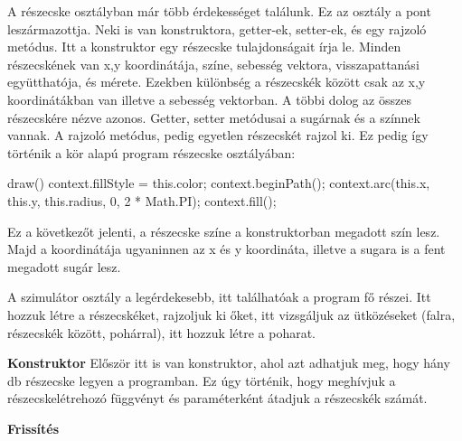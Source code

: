 
A részecske osztályban már több érdekességet találunk. Ez az osztály a pont leszármazottja. Neki is van konstruktora, getter-ek, setter-ek, és egy rajzoló metódus. Itt a konstruktor egy részecske tulajdonságait írja le. Minden részecskének van x,y koordinátája, színe, sebesség vektora, visszapattanási együtthatója, és mérete. Ezekben különbség a részecskék között csak az x,y koordinátákban van illetve a sebesség vektorban. A többi dolog az összes részecskére nézve azonos. Getter, setter metódusai a sugárnak és a színnek vannak. A rajzoló metódus, pedig egyetlen részecskét rajzol ki. Ez pedig így történik a kör alapú program részecske osztályában: 
\begin{java}
draw()
  {	
    context.fillStyle = this.color;
    context.beginPath();
    context.arc(this.x, this.y, this.radius, 0, 2 * Math.PI);
    context.fill();
  }
\end{java}
Ez a következőt jelenti, a részecske színe a konstruktorban megadott szín lesz. Majd a koordinátája ugyaninnen az x és y koordináta, illetve a sugara is a fent megadott sugár lesz. 


A szimulátor osztály a legérdekesebb, itt találhatóak a program fő részei. Itt hozzuk létre a részecskéket, rajzoljuk ki őket, itt vizsgáljuk az ütközéseket (falra, részecskék között, pohárral), itt hozzuk létre a poharat. 

\textbf{Konstruktor}
Először itt is van konstruktor, ahol azt adhatjuk meg, hogy hány db részecske legyen a programban. Ez úgy történik, hogy meghívjuk a részecskelétrehozó függvényt és paraméterként átadjuk a részecskék számát.

\textbf{Frissítés}

